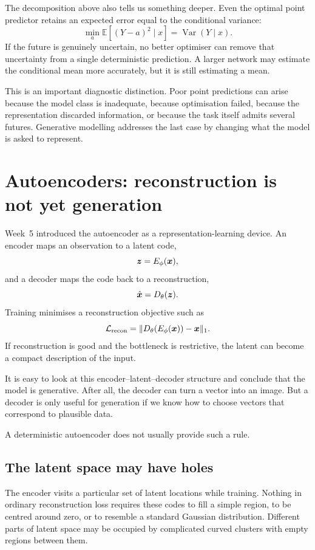The decomposition above also tells us something deeper. Even the optimal point predictor retains an expected error equal to the conditional variance:
\[
  \min_a \mathbb{E}[(Y-a)^2\mid x]
  = \operatorname{Var}(Y\mid x).
\]
If the future is genuinely uncertain, no better optimiser can remove that uncertainty from a single deterministic prediction. A larger network may estimate the conditional mean more accurately, but it is still estimating a mean.

This is an important diagnostic distinction. Poor point predictions can arise because the model class is inadequate, because optimisation failed, because the representation discarded information, or because the task itself admits several futures. Generative modelling addresses the last case by changing what the model is asked to represent.

\section{Autoencoders: reconstruction is not yet generation}

Week~5 introduced the autoencoder as a representation-learning device. An encoder maps an observation to a latent code,
\[
  \bm{z}=E_\phi(\bm{x}),
\]
and a decoder maps the code back to a reconstruction,
\[
  \hat{\bm{x}}=D_\theta(\bm{z}).
\]
Training minimises a reconstruction objective such as
\[
  \mathcal{L}_{\mathrm{recon}}
  = \|D_\theta(E_\phi(\bm{x}))-\bm{x}\|_1.
\]
If reconstruction is good and the bottleneck is restrictive, the latent can become a compact description of the input.

It is easy to look at this encoder--latent--decoder structure and conclude that the model is generative. After all, the decoder can turn a vector into an image. But a decoder is only useful for generation if we know how to choose vectors that correspond to plausible data.

A deterministic autoencoder does not usually provide such a rule.

\subsection{The latent space may have holes}

The encoder visits a particular set of latent locations while training. Nothing in ordinary reconstruction loss requires these codes to fill a simple region, to be centred around zero, or to resemble a standard Gaussian distribution. Different parts of latent space may be occupied by complicated curved clusters with empty regions between them.

